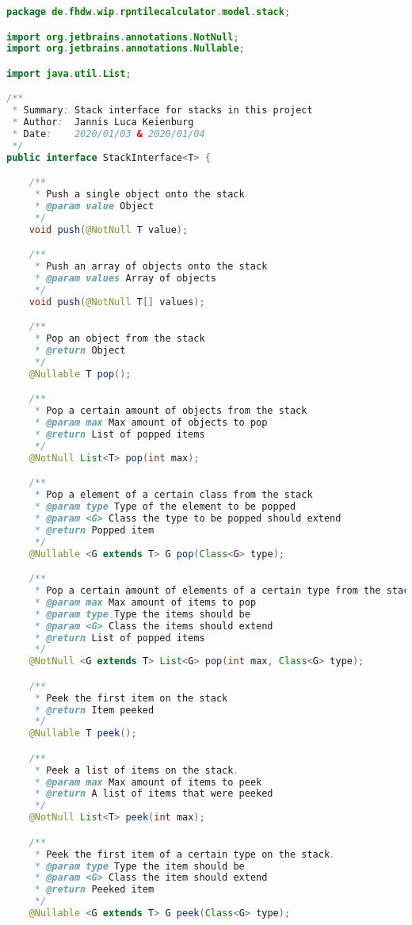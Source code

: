 \begin{lstlisting}[caption=StackInterface (Keienburg),label=list:StackInterface,language=Java]
package de.fhdw.wip.rpntilecalculator.model.stack;

import org.jetbrains.annotations.NotNull;
import org.jetbrains.annotations.Nullable;

import java.util.List;

/**
 * Summary: Stack interface for stacks in this project
 * Author:  Jannis Luca Keienburg
 * Date:    2020/01/03 & 2020/01/04
 */
public interface StackInterface<T> {

    /**
     * Push a single object onto the stack
     * @param value Object
     */
    void push(@NotNull T value);

    /**
     * Push an array of objects onto the stack
     * @param values Array of objects
     */
    void push(@NotNull T[] values);

    /**
     * Pop an object from the stack
     * @return Object
     */
    @Nullable T pop();

    /**
     * Pop a certain amount of objects from the stack
     * @param max Max amount of objects to pop
     * @return List of popped items
     */
    @NotNull List<T> pop(int max);

    /**
     * Pop a element of a certain class from the stack
     * @param type Type of the element to be popped
     * @param <G> Class the type to be popped should extend
     * @return Popped item
     */
    @Nullable <G extends T> G pop(Class<G> type);

    /**
     * Pop a certain amount of elements of a certain type from the stack.
     * @param max Max amount of items to pop
     * @param type Type the items should be
     * @param <G> Class the items should extend
     * @return List of popped items
     */
    @NotNull <G extends T> List<G> pop(int max, Class<G> type);

    /**
     * Peek the first item on the stack
     * @return Item peeked
     */
    @Nullable T peek();

    /**
     * Peek a list of items on the stack.
     * @param max Max amount of items to peek
     * @return A list of items that were peeked
     */
    @NotNull List<T> peek(int max);

    /**
     * Peek the first item of a certain type on the stack.
     * @param type Type the item should be
     * @param <G> Class the item should extend
     * @return Peeked item
     */
    @Nullable <G extends T> G peek(Class<G> type);


\end{lstlisting}
